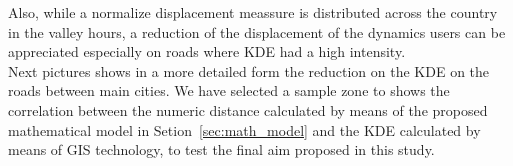 Also, while a normalize displacement meassure is distributed across the country in the valley hours, a reduction of the displacement of the dynamics users can be appreciated especially on roads where KDE had a high intensity.
\\
Next pictures shows in a more detailed form the reduction on the KDE on the roads between main cities. We have selected a sample zone to shows the correlation between the numeric distance calculated by means of the proposed mathematical model in Setion~\ref{sec:math_model} and the KDE calculated by means of GIS technology, to test the final aim proposed in this study.
\newpage

\begin{figure}
\centering
{}
\end{figure}
